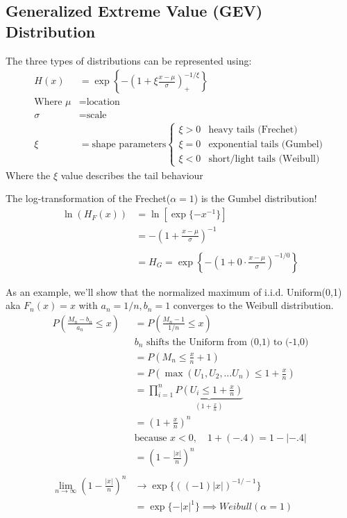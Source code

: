 \documentclass[
  oneside]{book}
\begin{document}
\hypertarget{generalized-extreme-value-gev-distribution}{%
\subsection{Generalized Extreme Value (GEV) Distribution}\label{generalized-extreme-value-gev-distribution}}

The three types of distributions can be represented using:
\[
\begin{aligned}
H(x) &= \exp\left\{ -\left( 1+\xi\frac{x-\mu}{\sigma} \right)^{-1/\xi}_{+} \right\}\\
\text{Where } \mu &= \text{location}\\
\sigma &= \text{scale}\\
\xi &= \text{shape parameters} \begin{cases}
\xi>0 & \text{heavy tails (Frechet)} \\
\xi=0 & \text{exponential tails (Gumbel)} \\
\xi < 0  & \text{short/light tails (Weibull)}
\end{cases}
\end{aligned}
\]
Where the \(\xi\) value describes the tail behaviour

The log-transformation of the Frechet(\(\alpha=1\)) is the Gumbel distribution!
\[
\begin{aligned}
\ln(H_{F}(x)) &= \ln\left[ \exp\{-x^{-1}\}\right]\\
&= -\left( 1+\frac{x-\mu}{\sigma} \right)^{-1}\\
\\
&= H_{G} = \exp \left\{ -\left( 1+0\cdot \frac{x-\mu}{\sigma} \right)^{-1/0} \right\}
\end{aligned}
\]

As an example, we'll show that the normalized maximum of i.i.d. Uniform(0,1) aka \(F_{n}(x) = x\) with \(a_{n}=1/n, b_{n}=1\) converges to the Weibull distribution.
\[
\begin{aligned}
P\left( \frac{M_{n}-b_{n}}{a_{n}} \leq x\right) &= P\left( \frac{M_{n}-1}{1/n} \leq x\right)\\
& b_{n}\text{ shifts the Uniform from (0,1) to (-1,0)}\\
&= P\left( M_{n} \leq \frac{x}{n}+1 \right)\\
&= P\left( \max(U_{1}, U_{2}, \dots U_{n}) \leq 1+\frac{x}{n} \right)\\
&= \prod^{n}_{i=1} \underbrace{ P\left( U_{i}\leq 1+\frac{x}{n} \right) }_{ \left( 1+\frac{x}{n} \right) }\\
&= \left( 1+\frac{x}{n} \right)^{n}\\
& \text{because } x<0, \quad 1+ (-.4) = 1-|-.4|\\
&=\left( 1-\frac{|x|}{n} \right)^{n}\\
\\
\lim_{ n \to \infty } \left( 1-\frac{|x|}{n} \right)^{n} &\to \exp\{((-1)|x|)^{-1/-1}\}\\
&= \exp\{-|x|^{1}\} \implies Weibull(\alpha=1)\\
\end{aligned}
\]
\end{document}
